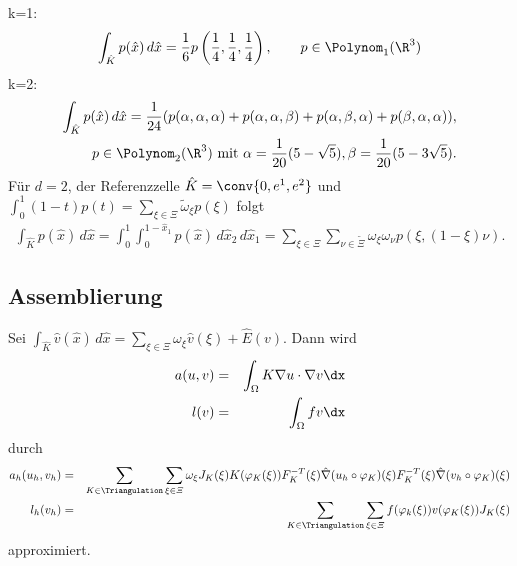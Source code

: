 \begin{Beispiel}
    k=1:
    \begin{eqnarray*}
          \int_{\hat K} p(\hat x) \,d\hat x
        = \frac{1}{6} p\left(\frac{1}{4}, \frac{1}{4}, \frac{1}{4}\right),
        \qquad p\in \Polynom_1(\R^3)
    \end{eqnarray*}
    k=2:
    \begin{eqnarray*}
          \int_{\hat K} p(\hat x) \,d\hat x
        = \frac{1}{24} (p(\alpha, \alpha, \alpha) + p(\alpha, \alpha, \beta)
          + p(\alpha, \beta, \alpha) + p(\beta, \alpha, \alpha)), \\
        \qquad p\in \Polynom_2(\R^3)
        \text{ mit } \alpha = \frac{1}{20} (5 - \sqrt{5}), \beta = \frac{1}{20}
        (5 - 3 \sqrt{5}).
    \end{eqnarray*}
    Für $d = 2$, der Referenzzelle $\hat K = \conv\{0, e^1, e^2\}$ und
    $\int_0^1 (1 - t) p(t) = \sum_{\xi\in \varXi} \tilde \omega_\xi p(\xi)$
    folgt
    \begin{eqnarray*}
          \int_{\hat K} p(\hat x) \,d\hat x
        = \int_0^1 \int_0^{1 - \hat x_1} p(\hat x) \,d\hat x_2 \,d\hat x_1
        = \sum_{\xi\in \varXi} \sum_{\nu\in \tilde \varXi} \omega_\xi \omega_\nu
          p(\xi, (1 - \xi) \nu).
    \end{eqnarray*}
\end{Beispiel}


\subsection{Assemblierung}



Sei $\int_{\hat K} \hat v(\hat x) \,d\hat x = \sum_{\xi\in \varXi} \omega_\xi
\hat v(\xi) + \hat E(v)$.
Dann wird
\begin{eqnarray*}
        a(u, v)
    &=& \int_\Omega K \nabla u \cdot \nabla v \dx \\
        l(v)
    &=& \int_\Omega f v \dx
\end{eqnarray*}
durch
\begin{eqnarray*}
        a_h(u_h, v_h)
    &=& \sum_{K\in\Triangulation} \sum_{\xi\in \varXi} \omega_\xi J_K(\xi)
        K(\varphi_K(\xi)) F_K^{-T}(\xi) \hat \nabla (u_h \circ \varphi_K)(\xi)
        F_K^{-T}(\xi) \hat\nabla (v_h \circ \varphi_K)(\xi) \\
        l_h(v_h)
    &=& \sum_{K\in\Triangulation} \sum_{\xi\in \varXi} f(\varphi_k(\xi))
        v(\varphi_K(\xi)) J_K(\xi)
\end{eqnarray*}
approximiert.

